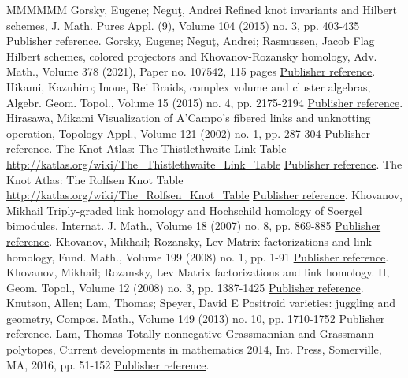 \begin{thebibliography}{MMMMMM}
 Gorsky, Eugene; Neguţ, Andrei Refined knot invariants and Hilbert schemes, J. Math. Pures Appl. (9), Volume 104 (2015) no. 3, pp. 403-435 \href{https://alco.centre-mersenne.org/articles/10.5802/alco.345/#GN}{Publisher reference}.
 Gorsky, Eugene; Neguţ, Andrei; Rasmussen, Jacob Flag Hilbert schemes, colored projectors and Khovanov-Rozansky homology, Adv. Math., Volume 378 (2021), Paper no. 107542, 115 pages \href{https://alco.centre-mersenne.org/articles/10.5802/alco.345/#GNR}{Publisher reference}.
 Hikami, Kazuhiro; Inoue, Rei Braids, complex volume and cluster algebras, Algebr. Geom. Topol., Volume 15 (2015) no. 4, pp. 2175-2194 \href{https://alco.centre-mersenne.org/articles/10.5802/alco.345/#HiIn}{Publisher reference}.
 Hirasawa, Mikami Visualization of A’Campo’s fibered links and unknotting operation, Topology Appl., Volume 121 (2002) no. 1, pp. 287-304 \href{https://alco.centre-mersenne.org/articles/10.5802/alco.345/#Hirasawa}{Publisher reference}.
 The Knot Atlas: The Thistlethwaite Link Table \url{http://katlas.org/wiki/The_Thistlethwaite_Link_Table} \href{https://alco.centre-mersenne.org/articles/10.5802/alco.345/#KAT}{Publisher reference}.
 The Knot Atlas: The Rolfsen Knot Table \url{http://katlas.org/wiki/The_Rolfsen_Knot_Table} \href{https://alco.centre-mersenne.org/articles/10.5802/alco.345/#KAT_knot}{Publisher reference}.
 Khovanov, Mikhail Triply-graded link homology and Hochschild homology of Soergel bimodules, Internat. J. Math., Volume 18 (2007) no. 8, pp. 869-885 \href{https://alco.centre-mersenne.org/articles/10.5802/alco.345/#KhoSoe}{Publisher reference}.
 Khovanov, Mikhail; Rozansky, Lev Matrix factorizations and link homology, Fund. Math., Volume 199 (2008) no. 1, pp. 1-91 \href{https://alco.centre-mersenne.org/articles/10.5802/alco.345/#KR1}{Publisher reference}.
 Khovanov, Mikhail; Rozansky, Lev Matrix factorizations and link homology. II, Geom. Topol., Volume 12 (2008) no. 3, pp. 1387-1425 \href{https://alco.centre-mersenne.org/articles/10.5802/alco.345/#KR2}{Publisher reference}.
 Knutson, Allen; Lam, Thomas; Speyer, David E Positroid varieties: juggling and geometry, Compos. Math., Volume 149 (2013) no. 10, pp. 1710-1752 \href{https://alco.centre-mersenne.org/articles/10.5802/alco.345/#KLS}{Publisher reference}.
 Lam, Thomas Totally nonnegative Grassmannian and Grassmann polytopes, Current developments in mathematics 2014, Int. Press, Somerville, MA, 2016, pp. 51-152 \href{https://alco.centre-mersenne.org/articles/10.5802/alco.345/#LamCDM}{Publisher reference}.

\end{thebibliography}
